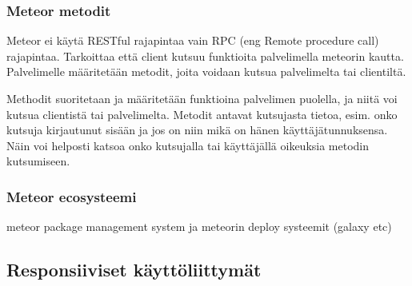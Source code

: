 \documentclass[11pt,a4paper,titlepage,oneside]{article}
\begin{document}
\subsubsection{Meteor metodit}





Meteor ei käytä RESTful rajapintaa vain RPC (eng Remote procedure call) rajapintaa. 
Tarkoittaa että client kutsuu funktioita palvelimella meteorin kautta.
Palvelimelle määritetään metodit, joita voidaan kutsua palvelimelta tai clientiltä.
\medskip


Methodit suoritetaan ja määritetään funktioina palvelimen puolella, ja niitä voi kutsua clientistä tai palvelimelta.
Metodit antavat kutsujasta tietoa, esim. onko kutsuja kirjautunut sisään ja jos on niin mikä on hänen käyttäjätunnuksensa. 
Näin voi helposti katsoa onko kutsujalla tai käyttäjällä oikeuksia metodin kutsumiseen.
\medskip




\subsubsection{Meteor ecosysteemi}
meteor package management system ja meteorin deploy systeemit (galaxy etc)








\newpage
{}%






\newpage
{}        %











\newpage
\subsection{Responsiiviset käyttöliittymät}
\end{document}
